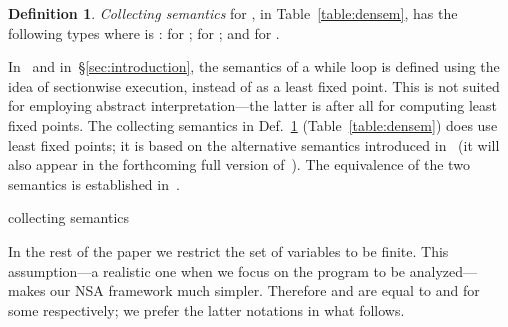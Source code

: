 \documentclass[envcountsect,orivec]{llncs} \pdfoutput=1
\theoremstyle{definition}
\newtheorem{mydef}[mythm]{Definition}
\begin{document}
\begin{mydef}\label{def:whiledtsem}
 \emph{Collecting semantics} for ,  
in Table~\ref{table:densem}, has the following
 types where  is : 
 for
 ;
 for
 ; and
 for .
\end{mydef}



In~\cite{Suenaga2011} and in~\S{}\ref{sec:introduction}, the
 semantics of a while loop is defined using the idea of
sectionwise execution, instead of as a least fixed point. This is not
suited for  employing abstract
interpretation---the latter is after all for computing least fixed points.
The collecting semantics in Def.~\ref{def:whiledtsem}
(Table~\ref{table:densem}) does use least fixed
points; it is based on the alternative  semantics 
introduced in~\cite{Kido2013} (it will also appear in the forthcoming full version
of~\cite{Suenaga2011, Hasuo2012}). The equivalence of the two semantics 
is established in~\cite{Kido2013}.






















\begin{table}[tbp]
 \centering
{}
\caption{ collecting semantics}
\label{table:densem}
\end{table}

















In the rest of the paper we restrict the set of variables  to be
finite. This as\-sump\-tion---a realistic one when we focus on the program
to be analyzed---makes our NSA framework much simpler. 
Therefore
 and  are equal to  and  for some  respectively; we prefer the latter notations in what follows.
\end{document}
